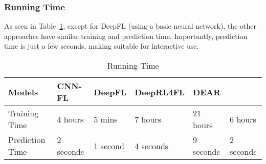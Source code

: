 
\subsubsection{{\bf Running Time}}

As seen in Table~\ref{tab:time}, except for DeepFL (using a basic
neural network),
the other approaches have similar training and prediction
time. Importantly, prediction time is just a few seconds, making
{\tool} suitable for interactive use.



\begin{table}[t]
	\caption{Running Time}
	\vspace{-12pt}
	\begin{center}
        \tabcolsep 2pt
		\small
		\renewcommand{\arraystretch}{1} 
		\begin{tabular}{p{1.8cm}<{\centering}|p{1.1cm}<{\centering}|p{1cm}<{\centering}|p{1.2cm}<{\centering}|p{1.1cm}<{\centering}|p{1.1cm}<{\centering}}
			\hline
			Models          & CNN-FL & DeepFL & DeepRL4FL & DEAR & {\tool} \\\hline
			Training Time & 4 hours & 5 mins & 7 hours & 21 hours & 6 hours \\
			Prediction Time & 2 seconds & 1 second & 4 seconds &9 seconds & 2 seconds\\ 
			\hline
		\end{tabular}
		\label{tab:time}
	\end{center}
\vspace{-5pt}
\end{table}
